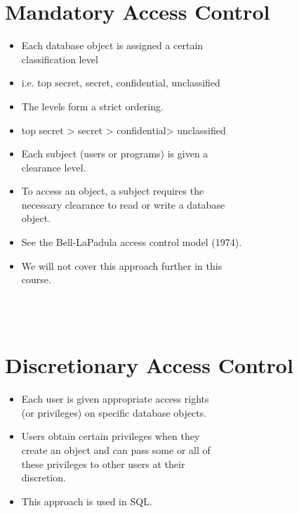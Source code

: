 \documentclass[12pt]{article}
\begin{document}
\begin{itemize}
\begin{itemize}
\begin{itemize}
\begin{itemize}
\begin{itemize}
\section{Mandatory Access Control}
\begin{itemize}
  \item Each database object is assigned a certain \\ 
classification level\\ 
  \item i.e. top secret, secret, confidential, unclassified\\ 
  \item The levels form a strict ordering.\\ 
  \item top secret > secret > confidential> unclassified\\ 
  \item Each subject (users or programs) is given a \\ 
clearance level.\\ 
  \item To access an object, a subject requires the \\ 
necessary clearance to read or write a database \\ 
object.\\ 
  \item See the Bell-LaPadula access control model (1974).\\ 
  \item We will not cover this approach further in this \\ 
course.\\ 
\end{itemize}
\\ 
 \\ 
\section{Discretionary Access Control}
\begin{itemize}
  \item Each user is given appropriate access rights \\ 
(or privileges) on specific database objects.\\ 
  \item Users obtain certain privileges when they \\ 
create an object and can pass some or all of \\ 
these privileges to other users at their \\ 
discretion.\\ 
  \item This approach is used in SQL.\\ 
\end{itemize}
\\ 
 \\ 

\end{itemize}
\end{itemize}
\end{itemize}
\end{itemize}
\end{itemize}
\end{document}
